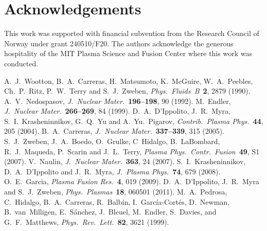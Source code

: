 \documentclass[aps,prb,12pt,a4paper,preprint,amsmath,amssymb,groupedaddress]{revtex4-1}
\newcommand{\CPP}{\textit{Contrib.\ Plasma Phys.}}
\newcommand{\JNM}{\textit{J.~Nuclear Mater.}}
\newcommand{\JPP}{\textit{J.~Plasma Phys.}}
\newcommand{\NF}{\textit{Nucl.\ Fusion}}
\newcommand{\PFB}{\textit{Phys.\ Fluids~B}}
\newcommand{\PPCF}{\textit{Plasma Phys.\ Contr.\ Fusion}}
\newcommand{\PFR}{\textit{Plasma Fusion Res.}}
\newcommand{\PP}{\textit{Phys.\ Plasmas}}
\newcommand{\PRL}{\textit{Phys.~Rev.\ Lett.}}
\begin{document}
\section*{Acknowledgements}



This work was supported with financial subvention from the Research Council of Norway under grant 240510/F20. The authors acknowledge the generous hospitality of the MIT Plasma Science and Fusion Center where this work was conducted.



\begin{thebibliography}{99}
%
%
A.~J.~Wootton, B.~A.~Carreras, H.~Matsumoto, K.~Mc{G}uire, W.~A.~Peebles, Ch.~P.~Ritz, P.~W.~Terry and S.~J.~Zweben, \PFB\ {\bf 2}, 2879 (1990).
%
A.~V.~Nedospasov, \JNM\ {\bf 196--198}, 90 (1992).
%
M.~Endler, \JNM\ {\bf 266--269}, 84 (1999).
%
D.~A.~D'{I}ppolito, J.~R.~Myra, S.~I.~Krasheninnikov, G.~Q.~Yu and A.~Yu.~Pigarov, \CPP\ {\bf 44}, 205 (2004).
%
B.~A.~Carreras, \JNM\ {\bf 337--339}, 315 (2005).
%
S.~J.~Zweben, J.~A.~Boedo, O.~Grulke, C~Hidalgo, B.~La{B}ombard, R.~J.~Maqueda, P.~Scarin and J.~L.~Terry, \PPCF\ {\bf 49}, S1 (2007).
%
%
V.~Naulin, \JNM\ {\bf 363}, 24 (2007).
%
S.~I.~Krasheninnikov, D.~A.~D'{I}ppolito and J.~R.~Myra, \JPP\ {\bf 74}, 679 (2008).
%
O.~E.~Garcia, \PFR\ {\bf 4}, 019 (2009).
%
D.~A.~D'{I}ppolito, J.~R.~Myra and S.~J.~Zweben, \PP\ {\bf 18}, 060501 (2011).
%
%
M.~A.~Pedrosa, C.~Hidalgo, B.~A.~Carreras, R.~Balb{\'i}n, I.~Garc{\'i}a-{C}ort{\'e}s, D.~Newman, B.~van~{M}illigen, E.~S{\'a}nchez, J.~Bleuel, M.~Endler, S.~Davies, and G.~F.~Matthews, \PRL\ {\bf 82}, 3621 (1999).

\end{thebibliography}
\end{document}
